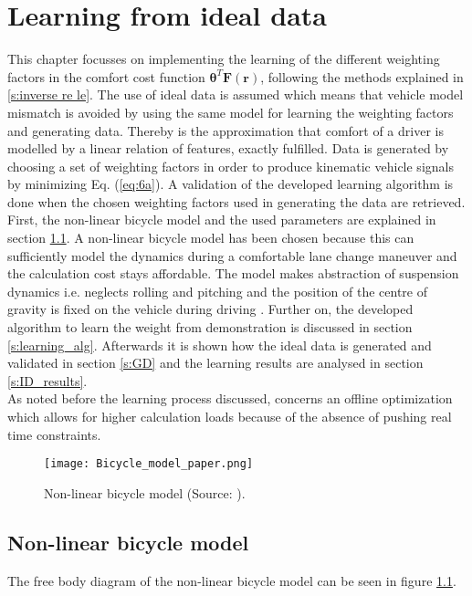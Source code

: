 \chapter{Learning from ideal data}
\label{cha:Learning_algorithm}
This chapter focusses on implementing the learning of the different weighting factors in the comfort cost function $\bm{\theta}^T\bm{F}(\bm{r})$, following the methods explained in \ref{s:inverse re le}. The use of ideal data is assumed which means that vehicle model mismatch is avoided by using the same model for learning the weighting factors and generating data. Thereby is the approximation that comfort of a driver is modelled by a linear relation of features, exactly fulfilled. Data is generated by choosing a set of weighting factors in order to produce kinematic vehicle signals by minimizing Eq. (\ref{eq:6a}). A validation of the developed learning algorithm is done when the chosen weighting factors used in generating the data are retrieved.\\

First, the non-linear bicycle model and the used parameters are explained in section \ref{sec:Vehicle_models}. A non-linear bicycle model has been chosen because this can sufficiently model the dynamics during a comfortable lane change maneuver and the calculation cost stays affordable. The model makes abstraction of suspension dynamics i.e. neglects rolling and pitching and the position of the centre of gravity is fixed on the vehicle during driving \cite{Yankov}. Further on, the developed algorithm to learn the weight from demonstration is discussed in section \ref{s:learning_alg}. Afterwards it is shown how the ideal data is generated and validated in section \ref{s:GD} and the learning results are analysed in section \ref{s:ID_results}.\\
As noted before the learning process discussed, concerns an offline optimization which allows for higher calculation loads because of the absence of pushing real time constraints.

\begin{figure}[h!]
	\centering
	\texttt{[image: Bicycle\_model\_paper.png]}
	\caption{Non-linear bicycle model (Source: \cite{TongDuySon2019}).}
	\label{fig:bicycle_model}
\end{figure}

\section{Non-linear bicycle model}\label{sec:Vehicle_models}
The free body diagram of the non-linear bicycle model can be seen in figure \ref{fig:bicycle_model}.


